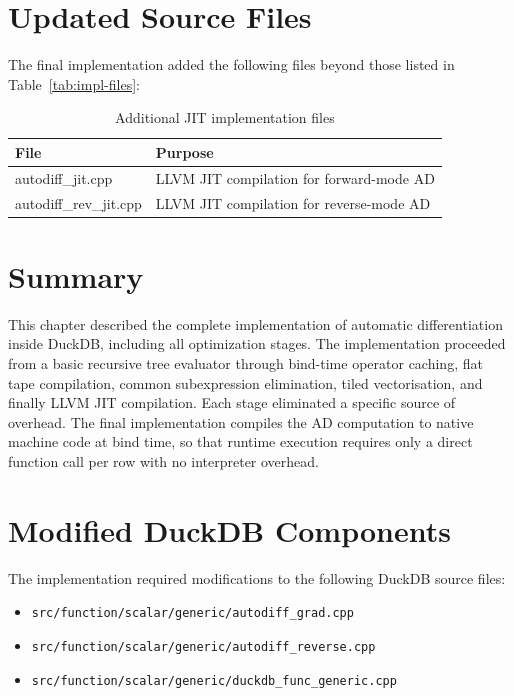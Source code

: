 \documentclass[12pt]{report}
\begin{document}
\section{Updated Source Files}

The final implementation added the following files beyond those listed in
Table~\ref{tab:impl-files}:

\begin{table}[H]
\centering
\begin{tabular}{|l|l|}
\hline
File & Purpose \\
\hline
autodiff\_jit.cpp & LLVM JIT compilation for forward-mode AD \\
autodiff\_rev\_jit.cpp & LLVM JIT compilation for reverse-mode AD \\
\hline
\end{tabular}
\caption{Additional JIT implementation files}
\label{tab:jit-files}
\end{table}

\section{Summary}

This chapter described the complete implementation of automatic differentiation inside DuckDB, including all optimization stages. The implementation proceeded from a basic recursive tree evaluator through bind-time operator caching, flat tape compilation, common subexpression elimination, tiled vectorisation, and finally LLVM JIT compilation. Each stage eliminated a specific source of overhead. The final implementation compiles the AD computation to native machine code at bind time, so that runtime execution requires only a direct function call per row with no interpreter overhead.

\section{Modified DuckDB Components}

The implementation required modifications to the following DuckDB source files:

\begin{itemize}
    \item \texttt{src/function/scalar/generic/autodiff\_grad.cpp}
    \item \texttt{src/function/scalar/generic/autodiff\_reverse.cpp}
    \item \texttt{src/function/scalar/generic/duckdb\_func\_generic.cpp}
\end{itemize}
\end{document}

